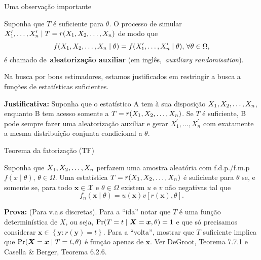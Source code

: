 \begin{frame}{Uma observação importante}

\begin{defn}
 \label{def:auxiliary_randomisation}
 Suponha que $T$ é suficiente para $\theta$. 
 O processo de simular $X_1^\prime, \ldots, X_n^\prime \mid T = r(X_1, X_2, \ldots, X_n)$ de modo que
 \[ f(X_1, X_2, \ldots, X_n \mid \theta) = f(X_1^\prime, \ldots, X_n^\prime \mid \theta),\, \forall \theta \in \Omega, \]
é chamado de~\textbf{aleatorização auxiliar} (em inglês,~\textit{auxiliary randomisation}).
\end{defn}
\begin{obs}
\label{rmk:good_estimators_sufficient}
 Na busca por bons estimadores, estamos justificados em restringir a busca a funções de estatísticas suficientes.
\end{obs}
\textbf{Justificativa:} Suponha que o estatístico A tem à sua disposição $X_1, X_2, \ldots, X_n$, enquanto B tem acesso somente a $T  = r(X_1, X_2, \ldots, X_n)$.
Se $T$ é suficiente, B pode sempre fazer uma aleatorização auxiliar e gerar $X_1^\prime, \ldots, X_n^\prime$ com exatamente a mesma distribuição conjunta condicional a $\theta$.
\end{frame}

\begin{frame}{Teorema da fatorização (TF)}
\begin{theo}
 \label{thm:factorisation}
Suponha que $X_1, X_2, \ldots, X_n$ perfazem uma amostra aleatória com f.d.p./f.m.p $f(x \mid \theta)$, $\theta \in \Omega$.
Uma estatística $T = r(X_1, X_2, \ldots, X_n)$ é suficiente para $\theta$ se, e somente se, para todo $\boldsymbol{x} \in \mathcal{X}$ e $\theta \in \Omega$ existem $u$ e $v$ não negativas tal que
\begin{equation*}
 f_n(\boldsymbol{x} \mid \theta) = u(\boldsymbol{x}) v[r(\boldsymbol{x}), \theta].
\end{equation*}
\end{theo}
\textbf{Prova:} (Para v.a.s discretas).
Para a ``ida'' notar que $T$ é uma função determinística de $X$, ou seja, $\operatorname{Pr}(T = t \mid \boldsymbol{X} = \boldsymbol{x} , \theta) = 1$ e que só precisamos considerar $\boldsymbol{x} \in \left\{ \boldsymbol{y} : r(\boldsymbol{y}) = t \right\}$.
Para a ``volta'', mostrar que $T$ suficiente implica que $\operatorname{Pr}(\boldsymbol{X} = \boldsymbol{x} \mid T = t, \theta)$ é função apenas de $\boldsymbol{x}$.
Ver DeGroot, Teorema 7.7.1 e Casella \& Berger, Teorema 6.2.6.
\end{frame}

